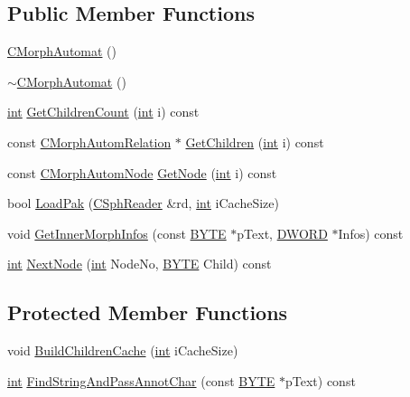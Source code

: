 \subsection*{Public Member Functions}
\begin{DoxyCompactItemize}
\item 
\hyperlink{classCMorphAutomat_a4023a2ed16cf138a9534436eac474c97}{C\-Morph\-Automat} ()
\item 
\hyperlink{classCMorphAutomat_a2457698e13f7d426b6f1d4d41dabc991}{$\sim$\-C\-Morph\-Automat} ()
\item 
\hyperlink{sphinxexpr_8cpp_a4a26e8f9cb8b736e0c4cbf4d16de985e}{int} \hyperlink{classCMorphAutomat_a11458f7d5e00e8df81d01ccd8d393a9a}{Get\-Children\-Count} (\hyperlink{sphinxexpr_8cpp_a4a26e8f9cb8b736e0c4cbf4d16de985e}{int} i) const 
\item 
const \hyperlink{structCMorphAutomRelation}{C\-Morph\-Autom\-Relation} $\ast$ \hyperlink{classCMorphAutomat_a31ce13d237af44d1ae274aa4179c10e5}{Get\-Children} (\hyperlink{sphinxexpr_8cpp_a4a26e8f9cb8b736e0c4cbf4d16de985e}{int} i) const 
\item 
const \hyperlink{structCMorphAutomNode}{C\-Morph\-Autom\-Node} \hyperlink{classCMorphAutomat_ab016d540d96f9ebeba4c7446587eb984}{Get\-Node} (\hyperlink{sphinxexpr_8cpp_a4a26e8f9cb8b736e0c4cbf4d16de985e}{int} i) const 
\item 
bool \hyperlink{classCMorphAutomat_a79e72578ff4f25ea46072694196232a0}{Load\-Pak} (\hyperlink{classCSphReader}{C\-Sph\-Reader} \&rd, \hyperlink{sphinxexpr_8cpp_a4a26e8f9cb8b736e0c4cbf4d16de985e}{int} i\-Cache\-Size)
\item 
void \hyperlink{classCMorphAutomat_ae1b7dc7367efebab5b76758b9d1990cf}{Get\-Inner\-Morph\-Infos} (const \hyperlink{sphinxstd_8h_a4ae1dab0fb4b072a66584546209e7d58}{B\-Y\-T\-E} $\ast$p\-Text, \hyperlink{sphinxstd_8h_a798af1e30bc65f319c1a246cecf59e39}{D\-W\-O\-R\-D} $\ast$Infos) const 
\item 
\hyperlink{sphinxexpr_8cpp_a4a26e8f9cb8b736e0c4cbf4d16de985e}{int} \hyperlink{classCMorphAutomat_a9c31cbfc0b1144c30fbc360e26ef6310}{Next\-Node} (\hyperlink{sphinxexpr_8cpp_a4a26e8f9cb8b736e0c4cbf4d16de985e}{int} Node\-No, \hyperlink{sphinxstd_8h_a4ae1dab0fb4b072a66584546209e7d58}{B\-Y\-T\-E} Child) const 
\end{DoxyCompactItemize}
\subsection*{Protected Member Functions}
\begin{DoxyCompactItemize}
\item 
void \hyperlink{classCMorphAutomat_a6f1ef643908a6ba86f22bf0102e576aa}{Build\-Children\-Cache} (\hyperlink{sphinxexpr_8cpp_a4a26e8f9cb8b736e0c4cbf4d16de985e}{int} i\-Cache\-Size)
\item 
\hyperlink{sphinxexpr_8cpp_a4a26e8f9cb8b736e0c4cbf4d16de985e}{int} \hyperlink{classCMorphAutomat_ad60b7c0e37dcdc8a0024470676b892a5}{Find\-String\-And\-Pass\-Annot\-Char} (const \hyperlink{sphinxstd_8h_a4ae1dab0fb4b072a66584546209e7d58}{B\-Y\-T\-E} $\ast$p\-Text) const 
\end{DoxyCompactItemize}
